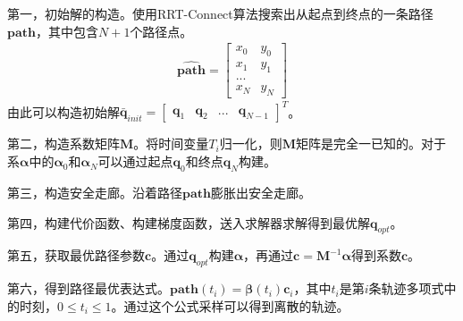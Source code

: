 \documentclass[master,academic]{ysuthesis} %
\begin{document}
		第一，初始解的构造。使用RRT-Connect算法搜索出从起点到终点的一条路径$\bm{\hat{path}}$，其中包含$N+1$个路径点。
		\begin{equation}
			\begin{aligned}
				\bm{\hat{path}} = \begin{bmatrix}
					x_0 &y_0\\
					x_1&y_1\\
					...\\
					x_N& y_N
				\end{bmatrix} 
			\end{aligned}
		\end{equation}
		由此可以构造初始解$\bm{\bar{q}}_{init}
		=\begin{bmatrix}
			\bm{q}_1& \bm{q}_2& ...&\bm{q}_{N-1}
		\end{bmatrix}^T$。

		第二，构造系数矩阵$\bm{M}$。将时间变量$T_i$归一化，则$\bm{M}$矩阵是完全一已知的。对于系$\bm{\alpha}$中的$\bm{\alpha}_0$和$\bm{\alpha}_N$可以通过起点$\bm{q}_0$和终点$\bm{q}_N$构建。
		
		第三，构造安全走廊。沿着路径$\bm{\hat{path}}$膨胀出安全走廊。

		第四，构建代价函数、构建梯度函数，送入求解器求解得到最优解$\bm{q}_{opt}$。

		第五，获取最优路径参数$\bm{c}$。通过$\bm{q}_{opt}$构建$\bm{\alpha}$，再通过$\bm{c} = \bm{M}^{-1}\bm{\alpha}$得到系数$\bm{c}$。

		第六，得到路径最优表达式。$\bm{path}(t_i)=\bm{\beta}(t_i)\bm{c}_i$，其中$t_i$是第$i$条轨迹多项式中的时刻，$0 \le t_i \le 1$。通过这个公式采样可以得到离散的轨迹。
		
		
\end{document}
